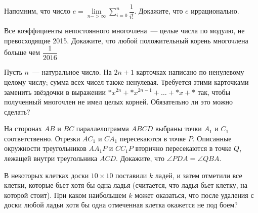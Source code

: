 \documentclass[14pt,DIV14]{scrartcl}
\begin{document}

\begin{task}
Напомним, что число $e=\lim\limits_{n->\infty}\sum\limits_{i=0}^n \dfrac{1}{i!}$. Докажите, что $e$ иррационально.
\end{task}

\begin{task}
Все коэффициенты непостоянного многочлена~--- целые числа по модулю, не превосходящие 2015. Докажите, что любой положительный корень многочлена больше чем $\dfrac{1}{2016}$  
\end{task}



\begin{task}
Пусть $n$~--- натуральное число. На $2n + 1$ карточках написано по ненулевому целому числу; сумма всех чисел также ненулевая. Требуется этими карточками заменить звёздочки в выражении $*x^{2n} + *x^{2n-1} + \ldots + *x + *$ так, чтобы полученный многочлен не имел целых корней. Обязательно ли это можно сделать?
\end{task}



\begin{task}
На сторонах $AB$ и $BC$ параллелограмма $ABCD$ выбраны точки $A_1$
и $C_1$ соответственно. Отрезки $AC_1$ и $CA_1$ пересекаются в точке $P$. Описанные окружности треугольников $AA_1P$ и $CC_1P$ вторично пересекаются
в точке $Q$, лежащей внутри треугольника $ACD$. Докажите, что $\angle PDA =\angle QBA$.
\end{task}
\begin{task}
В некоторых клетках доски $10\times 10$ поставили $k$ ладей, и затем отметили все клетки, которые бьет хотя бы одна ладья (считается, что ладья бьет клетку, на которой стоит). При каком наибольшем $k$ может оказаться, что после удаления с доски любой ладьи хотя бы одна отмеченная
клетка окажется не под боем?
\end{task}
\end{document}
